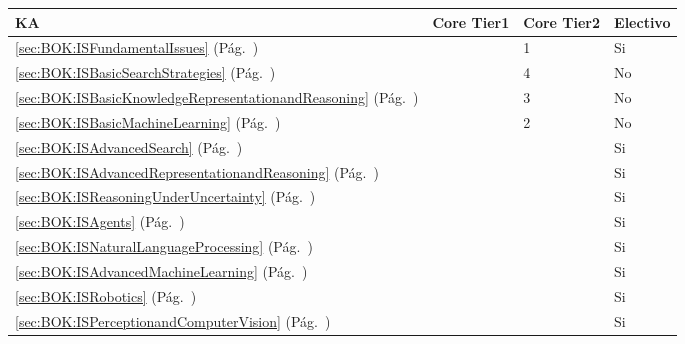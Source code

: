 \begin{center}
\begin{tabularx}{\textwidth}{|X|p{1cm}|p{1cm}|p{1.4cm}|}\hline
\textbf{\acf{KA}} & \textbf{Core Tier1} & \textbf{Core Tier2} & \textbf{Electivo} \\ \hline
\ref{sec:BOK:ISFundamentalIssues} \htmlref{\ISFundamentalIssues}{sec:BOK:ISFundamentalIssues}\xspace (Pág.~\pageref{sec:BOK:ISFundamentalIssues}) & ~ & 1 & Si \\ \hline
\ref{sec:BOK:ISBasicSearchStrategies} \htmlref{\ISBasicSearchStrategies}{sec:BOK:ISBasicSearchStrategies}\xspace (Pág.~\pageref{sec:BOK:ISBasicSearchStrategies}) & ~ & 4 & No \\ \hline
\ref{sec:BOK:ISBasicKnowledgeRepresentationandReasoning} \htmlref{\ISBasicKnowledgeRepresentationandReasoning}{sec:BOK:ISBasicKnowledgeRepresentationandReasoning}\xspace (Pág.~\pageref{sec:BOK:ISBasicKnowledgeRepresentationandReasoning}) & ~ & 3 & No \\ \hline
\ref{sec:BOK:ISBasicMachineLearning} \htmlref{\ISBasicMachineLearning}{sec:BOK:ISBasicMachineLearning}\xspace (Pág.~\pageref{sec:BOK:ISBasicMachineLearning}) & ~ & 2 & No \\ \hline
\ref{sec:BOK:ISAdvancedSearch} \htmlref{\ISAdvancedSearch}{sec:BOK:ISAdvancedSearch}\xspace (Pág.~\pageref{sec:BOK:ISAdvancedSearch}) & ~ & ~ & Si \\ \hline
\ref{sec:BOK:ISAdvancedRepresentationandReasoning} \htmlref{\ISAdvancedRepresentationandReasoning}{sec:BOK:ISAdvancedRepresentationandReasoning}\xspace (Pág.~\pageref{sec:BOK:ISAdvancedRepresentationandReasoning}) & ~ & ~ & Si \\ \hline
\ref{sec:BOK:ISReasoningUnderUncertainty} \htmlref{\ISReasoningUnderUncertainty}{sec:BOK:ISReasoningUnderUncertainty}\xspace (Pág.~\pageref{sec:BOK:ISReasoningUnderUncertainty}) & ~ & ~ & Si \\ \hline
\ref{sec:BOK:ISAgents} \htmlref{\ISAgents}{sec:BOK:ISAgents}\xspace (Pág.~\pageref{sec:BOK:ISAgents}) & ~ & ~ & Si \\ \hline
\ref{sec:BOK:ISNaturalLanguageProcessing} \htmlref{\ISNaturalLanguageProcessing}{sec:BOK:ISNaturalLanguageProcessing}\xspace (Pág.~\pageref{sec:BOK:ISNaturalLanguageProcessing}) & ~ & ~ & Si \\ \hline
\ref{sec:BOK:ISAdvancedMachineLearning} \htmlref{\ISAdvancedMachineLearning}{sec:BOK:ISAdvancedMachineLearning}\xspace (Pág.~\pageref{sec:BOK:ISAdvancedMachineLearning}) & ~ & ~ & Si \\ \hline
\ref{sec:BOK:ISRobotics} \htmlref{\ISRobotics}{sec:BOK:ISRobotics}\xspace (Pág.~\pageref{sec:BOK:ISRobotics}) & ~ & ~ & Si \\ \hline
\ref{sec:BOK:ISPerceptionandComputerVision} \htmlref{\ISPerceptionandComputerVision}{sec:BOK:ISPerceptionandComputerVision}\xspace (Pág.~\pageref{sec:BOK:ISPerceptionandComputerVision}) & ~ & ~ & Si \\ \hline
\end{tabularx}
\end{center}
